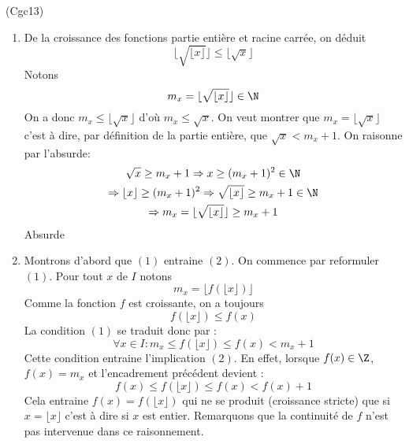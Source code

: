 \begin{tiny}(Cgc13)\end{tiny}
\begin{enumerate}
 \item De la croissance des fonctions partie entière et racine carrée, on déduit
\begin{displaymath}
  \lfloor \sqrt{\lfloor x \rfloor} \rfloor \leq \lfloor \sqrt{x} \rfloor
\end{displaymath}
Notons 
\begin{displaymath}
  m_x = \lfloor \sqrt{\lfloor x \rfloor} \rfloor \in \N
\end{displaymath}
On a donc $m_x \leq \lfloor \sqrt{x} \rfloor$ d'où $m_x\leq \sqrt{x}$. On veut montrer que $m_x = \lfloor \sqrt{x} \rfloor$ c'est à dire, par définition de la partie entière, que $\sqrt{x} < m_x +1$.
On raisonne par l'absurde:
\begin{multline*}
\sqrt{x}\geq m_x + 1 \Rightarrow x \geq (m_x+1)^2 \in \N \\
\Rightarrow \lfloor x \rfloor \geq (m_x+1)^2
\Rightarrow \sqrt{\lfloor x \rfloor} \geq m_x + 1 \in \N \\
\Rightarrow m_x = \lfloor \sqrt{\lfloor x \rfloor} \rfloor \geq m_x + 1
\end{multline*}
Absurde
 
 \item  Montrons d'abord que $(1)$ entraine $(2)$.\newline
On commence par reformuler $(1)$.\newline
Pour tout $x$ de $I$ notons
\begin{displaymath}
 m_x = \lfloor f(\lfloor x \rfloor)\rfloor
\end{displaymath}
Comme la fonction $f$ est croissante, on a toujours
\begin{displaymath}
 f(\lfloor x \rfloor) \leq f(x)
\end{displaymath}
La condition $(1)$ se traduit donc par :
\begin{displaymath}
 \forall x\in I : m_x\leq f(\lfloor x \rfloor) \leq f(x) < m_x +1
\end{displaymath}
Cette condition entraine l'implication $(2)$. En effet, lorsque $f(x)\in \Z$, $f(x)=m_x$ et l'encadrement précédent devient :
\begin{displaymath}
 f(x)\leq f(\lfloor x \rfloor) \leq f(x) < f(x) +1
\end{displaymath}
Cela entraine $f(x)=f(\lfloor x \rfloor)$ qui ne se produit (croissance stricte) que si $x=\lfloor x \rfloor$ c'est à dire si $x$ est entier.\newline
Remarquons que la continuité de $f$ n'est pas intervenue dans ce raisonnement.


\end{enumerate}
